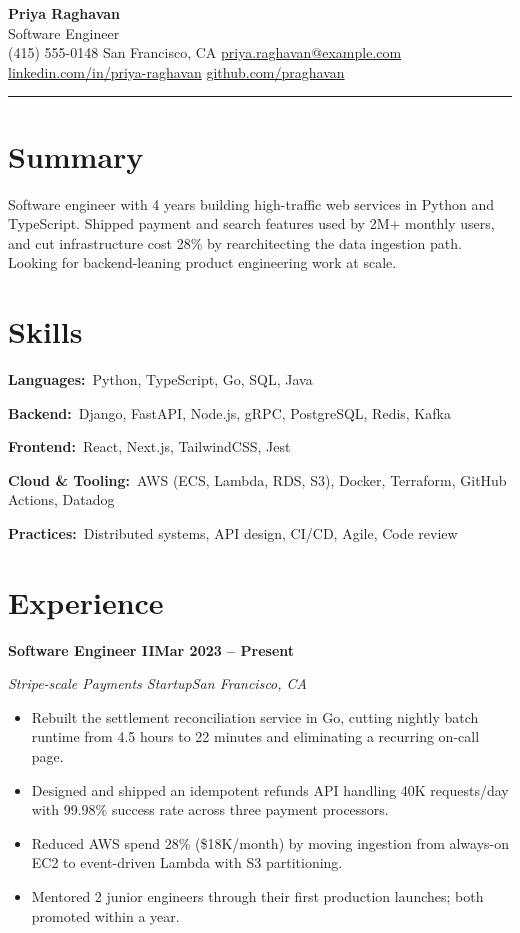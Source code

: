 \documentclass[letterpaper,10pt]{article}
\makeatletter
\newcommand{\csep}{\hspace{5pt}\textbar\hspace{5pt}}
\newcommand{\rRole}[4]{%
  \vspace{3pt}%
  \noindent\textbf{#1}\hfill\textbf{#4}\par
  \noindent\textit{\color{muted}#2}\hfill\textit{\color{muted}#3}\par
  \vspace{1pt}%
}
\newcommand{\rSkill}[2]{\noindent\textbf{#1:}\ #2\par\vspace{2pt}}
\newenvironment{rBullets}
  {\begin{itemize}[leftmargin=13pt,itemsep=1.5pt,parsep=0pt,topsep=2pt,
                   partopsep=0pt,label=\textbullet]}
  {\end{itemize}}
\def\name{Priya Raghavan}
\def\role{Software Engineer}
\def\phone{(415) 555-0148}
\def\location{San Francisco, CA}
\def\email{priya.raghavan@example.com}
\def\LinkedIn{priya-raghavan}
\def\github{praghavan}
\makeatother
\begin{document}
\begin{center}
  {\LARGE\bfseries\color{bodytext}\name}\\[3pt]
  {\large\color{accent}\role}\\[5pt]
  {\small
    \phone\csep
    \location\csep
    \href{mailto:\email}{\email}\csep
    \href{https://linkedin.com/in/\LinkedIn}{linkedin.com/in/\LinkedIn}\csep
    \href{https://github.com/\github}{github.com/\github}}
\end{center}
\vspace{3pt}
{\color{accent}\rule{\linewidth}{1.2pt}}

\section{Summary}
Software engineer with 4 years building high-traffic web services in Python and
TypeScript. Shipped payment and search features used by 2M+ monthly users, and
cut infrastructure cost 28\% by rearchitecting the data ingestion path. Looking
for backend-leaning product engineering work at scale.

\section{Skills}
\rSkill{Languages}{Python, TypeScript, Go, SQL, Java}
\rSkill{Backend}{Django, FastAPI, Node.js, gRPC, PostgreSQL, Redis, Kafka}
\rSkill{Frontend}{React, Next.js, TailwindCSS, Jest}
\rSkill{Cloud \& Tooling}{AWS (ECS, Lambda, RDS, S3), Docker, Terraform, GitHub Actions, Datadog}
\rSkill{Practices}{Distributed systems, API design, CI/CD, Agile, Code review}

\section{Experience}

\rRole{Software Engineer II}{Stripe-scale Payments Startup}{San Francisco, CA}{Mar 2023 -- Present}
\begin{rBullets}
  \item Rebuilt the settlement reconciliation service in Go, cutting nightly batch runtime from 4.5 hours to 22 minutes and eliminating a recurring on-call page.
  \item Designed and shipped an idempotent refunds API handling 40K requests/day with 99.98\% success rate across three payment processors.
  \item Reduced AWS spend 28\% (\$18K/month) by moving ingestion from always-on EC2 to event-driven Lambda with S3 partitioning.
  \item Mentored 2 junior engineers through their first production launches; both promoted within a year.
\end{rBullets}
\end{document}
